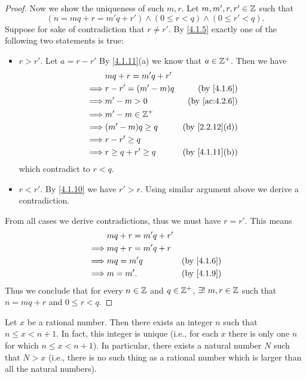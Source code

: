 \begin{proof}
  Now we show the uniqueness of such \(m, r\).
  Let \(m, m', r, r' \in \mathbb{Z}\) such that
  \[
    (n = mq + r = m'q + r') \land (0 \leq r < q) \land (0 \leq r' < q).
  \]
  Suppose for sake of contradiction that \(r \neq r'\).
  By \cref{4.1.5} exactly one of the following two statements is true:
  \begin{itemize}
    \item \(r > r'\).
          Let \(a = r - r'\)
          By \cref{4.1.11}(a) we know that \(a \in \mathbb{Z}^+\).
          Then we have
          \begin{align*}
                     & mq + r = m'q + r'                                   \\
            \implies & r - r' = (m' - m)q   & \text{(by \cref{4.1.6})}     \\
            \implies & m' - m > 0           & \text{(by \cref{ac:4.2.6})}  \\
            \implies & m' - m \in \Z^+                                     \\
            \implies & (m' - m)q \geq q     & \text{(by \cref{2.2.12}(d))} \\
            \implies & r - r' \geq q                                       \\
            \implies & r \geq q + r' \geq q & \text{(by \cref{4.1.11}(b))}
          \end{align*}
          which contradict to \(r < q\).
    \item \(r < r'\).
          By \cref{4.1.10} we have \(r' > r\).
          Using similar argument above we derive a contradiction.
  \end{itemize}
  From all cases we derive contradictions, thus we must have \(r = r'\).
  This means
  \begin{align*}
             & mq + r = m'q + r'                            \\
    \implies & mq + r = m'q + r                             \\
    \implies & mq = m'q          & \text{(by \cref{4.1.6})} \\
    \implies & m = m'.           & \text{(by \cref{4.1.9})}
  \end{align*}
  Thus we conclude that for every \(n \in \mathbb{Z}\) and \(q \in \mathbb{Z}^+\), \(\exists!\ m, r \in \mathbb{Z}\) such that \(n = mq + r\) and \(0 \leq r < q\).
\end{proof}

\begin{prop}\label{4.4.1}
  Let \(x\) be a rational number.
  Then there exists an integer \(n\) such that \(n \leq x < n + 1\).
  In fact, this integer is unique (i.e., for each \(x\) there is only one \(n\) for which \(n \leq x < n + 1\)).
  In particular, there exists a natural number \(N\) such that \(N > x\)
  (i.e., there is no such thing as a rational number which is larger than all the natural numbers).
\end{prop}

